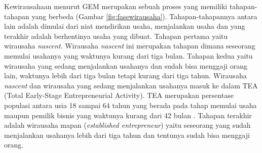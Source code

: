 Kewirausahaan menurut GEM merupakan sebuah proses yang memiliki tahapan-tahapan yang berbeda (Gambar \ref{fig:fasewirausaha}). Tahapan-tahapannya antara lain adalah dimulai dari niat mendirikan usaha, menjalankan usaha dan yang terakhir adalah berhentinya usaha yang dibuat. Tahapan pertama yaitu wirausaha \textit{nascent}. Wirausaha \textit{nascent} ini merupakan tahapan dimana seseorang memulai usahanya yang waktunya kurang dari tiga bulan. Tahapan kedua yaitu wirausaha yang sedang menjalankan usahanya dan sudah bisa menggaji orang lain, waktunya lebih dari tiga bulan tetapi kurang dari tiga tahun. Wirausaha \textit{nascent} dan wirausaha yang sedang menjalankan usahanya masuk ke dalam TEA (Total Early-Stage Entrepreneurial Activity). TEA merupakan persentase populasi antara usia 18 sampai 64 tahun yang berada pada tahap memulai usaha maupun pemilik bisnis yang waktunya kurang dari 42 bulan \cite{wirausahaGEM}. Tahapan terakhir adalah wirausaha mapan (\textit{established entrepreneur}) yaitu seseorang yang sudah menjalankan usahanya lebih dari tiga tahun dan tentunya sudah bisa menggaji orang.\cite{GEM2013}


